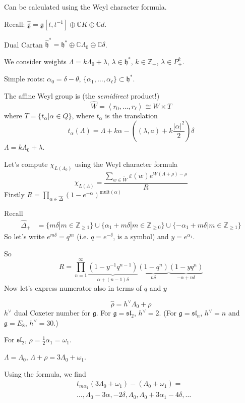 Can be calculated using the Weyl character
formula.

Recall:
$\hat{\mathfrak{g}}=\mathfrak{g}[t,t^{-1}]
\oplus \mathbb{C}K
\oplus \mathbb{C}d$.

Dual Cartan
$\hat{\mathfrak{h}}^*=\mathfrak{h}
^*\oplus\mathbb{C}\Lambda_0
\oplus\mathbb{C}\delta$.

We consider weights
$\Lambda=k\Lambda_0+\lambda$, $\lambda \in
\mathfrak{h}^*$,
$k \in \mathbb{Z}_+$, $\lambda \in P_+^k$.

Simple roots: $\alpha_0=\delta-\theta$,
$\{\alpha_1,\ldots,\alpha_\ell\}
\subset \mathfrak{h}^*$.

The affine Weyl group is (the {\it
semidirect} product!)
$$
\widehat{W}=\left\langle{}r_0,\ldots,r_\ell\right\rangle{}
\cong W \times T
$$
where $T=\{t_\alpha | \alpha \in Q\}$, where
$t_\alpha$ is the translation
$$
t_\alpha(\Lambda)=\Lambda+k\alpha-
\left((\lambda,a)+k
\frac{|\alpha|^2}{2}\right)\delta
$$
$\Lambda=k\Lambda_0+\lambda$.

\medskip\noindent
Let's compute $\chi_{L(\Lambda_0)}$ using the
Weyl character formula
$$
\chi_{L(\Lambda)}=\frac{\sum_{w \in
\tilde{W}}\varepsilon(w)
e^{W(\Lambda+\rho)-\rho}}{R}
$$
Firstly $R=\prod_{\alpha \in
\hat{\Delta}}(1-e^{-\alpha})
^{\text{mult}(\alpha)}$

Recall
$$
\begin{aligned}
\hat{\Delta}_+&=\{m\delta | m \in
\mathbb{Z}_{\geq 1}\}
\cup \{\alpha_1+m\delta|m \in
\mathbb{Z}_{\geq 0}\}
\cup \{-\alpha_1+m \delta |m \in
\mathbb{Z}_{\geq 1}\}
\end{aligned}
$$
So let's write $e^{m \delta}=q^m$ (i.e. $q =
e^{-\delta}$, is a symbol)
and $y=e^{\alpha_1}$.

So
$$
R=\prod_{n=1}^{\infty}\underbrace{(1-y^{-1}
q^{n-1})
}_{\alpha+(n-1)\delta
}\underbrace{(1-q^n)
}_{n\delta}\underbrace{(1-yq^n)
}_{-\alpha+n\delta}
$$
Now let's express numerator also in terms of
$q$ and $y$

$$
\hat{\rho}=h^\vee\Lambda_0+\rho
$$
$h^\vee$ dual Coxeter number for
$\mathfrak{g}$.
For $\mathfrak{g}=\mathfrak{sl}_2$,
$h^\vee=2$.
(For $\mathfrak{g}=\mathfrak{sl}_n$,
$h^\vee=n$ and $\mathfrak{g}=E_8$,
$h^\vee=30$.)

For $\mathfrak{sl}_2$,
$\rho=\frac{1}{2}\alpha_1=\omega_1$.

$\Lambda=\Lambda_0$,
$\Lambda+\rho=3\Lambda_0+\omega_1$.

Using the formula, we find
$$
\begin{aligned}
&t_{m
\alpha_1}(3\Lambda_0+\omega_1)-(\Lambda_0+
\omega_1)=\\
&\ldots,\Lambda_0-3\alpha,-2\delta,\Lambda_0,
\Lambda_0+3\alpha_1-4\delta,\ldots
\end{aligned}
$$

